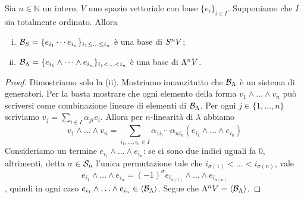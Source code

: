 \begin{proposition}
Sia $n\in\mathbb{N}$ un intero, $V$ uno spazio vettoriale con base $\{e_i\}_{i\in I}$. Supponiamo che $I$ sia totalmente ordinato. Allora
\begin{enumerate}[(i)]
\item $\mathcal{B}_S=\{e_{i_1}\cdots e_{i_n}\}_{i_1\le\ldots\le i_n}$ è una base di $S^nV$;
\item $\mathcal{B}_\Lambda=\{e_{i_1}\wedge\cdots\wedge e_{i_n}\}_{i_1<\ldots<i_n}$ è una base di $\Lambda^nV$.
\end{enumerate}
\end{proposition}
\begin{proof}
Dimostriamo solo la (ii). Mostriamo innanzitutto che $\mathcal{B}_\Lambda$ è un sistema di generatori. Per la  basta mostrare che ogni elemento della forma $v_1\wedge\ldots\wedge v_n$ può scriversi come combinazione lineare di elementi di $\mathcal{B}_\Lambda$. Per ogni $j\in\{1,\ldots,n\}$ scriviamo $v_j=\sum_{i\in I}\alpha_{ji}e_i$. Allora per $n$-linearità di $\lambda$ abbiamo
$$
v_1\wedge\ldots\wedge v_n=\sum_{i_1,\ldots,i_n\in I}\alpha_{1i_i}\cdots\alpha_{ni_n}(e_{i_1}\wedge\ldots\wedge e_{i_n})
$$
Consideriamo un termine $e_{i_1}\wedge\ldots\wedge e_{i_n}$: se ci sono due indici uguali fa 0, altrimenti, detta $\sigma\in\mathcal{S}_n$ l'unica permutazione tale che $i_{\sigma(1)}<\ldots<i_{\sigma(n)}$, vale 
$$
e_{i_1}\wedge\ldots\wedge e_{i_n}=(-1)^\sigma e_{i_{\sigma(1)}}\wedge\ldots\wedge e_{i_{\sigma(n)}}
$$
, quindi in ogni caso $e_{i_1}\wedge\ldots\wedge e_{i_n}\in\langle\mathcal{B}_\Lambda\rangle$. Segue che $\Lambda^nV=\langle\mathcal{B}_\Lambda\rangle$.


\end{proof}
